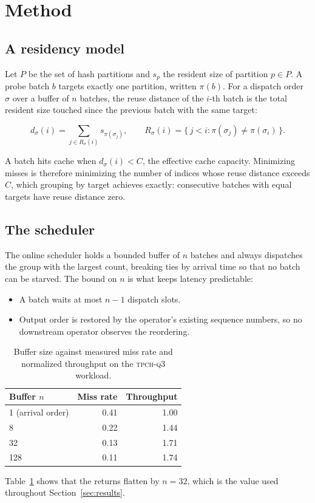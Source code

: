 \section{Method}
\label{sec:method}

\subsection{A residency model}

Let \(P\) be the set of hash partitions and \(s_p\) the resident size of
partition \(p \in P\). A probe batch \(b\) targets exactly one partition,
written \(\pi(b)\). For a dispatch order \(\sigma\) over a buffer of \(n\)
batches, the reuse distance of the \(i\)-th batch is the total resident
size touched since the previous batch with the same target:

\begin{equation}
\label{eq:reuse}
d_\sigma(i) = \sum_{j \in R_\sigma(i)} s_{\pi(\sigma_j)},
\qquad
R_\sigma(i) = \{\, j < i : \pi(\sigma_j) \neq \pi(\sigma_i) \,\}.
\end{equation}

A batch hits cache when \(d_\sigma(i) < C\), the effective cache capacity.
Minimizing misses is therefore minimizing the number of indices whose
reuse distance exceeds \(C\), which grouping by target achieves exactly:
consecutive batches with equal targets have reuse distance zero.

\subsection{The scheduler}

The online scheduler holds a bounded buffer of \(n\) batches and always
dispatches the group with the largest count, breaking ties by arrival
time so that no batch can be starved. The bound on \(n\) is what keeps
latency predictable:

\begin{itemize}
\item A batch waits at most \(n - 1\) dispatch slots.
\item Output order is restored by the operator's existing sequence
  numbers, so no downstream operator observes the reordering.
\end{itemize}

\begin{table}[htbp]
\centering
\begin{tabular}{lrr}
\toprule
Buffer \(n\) & Miss rate & Throughput \\
\midrule
1 (arrival order) & 0.41 & 1.00 \\
8 & 0.22 & 1.44 \\
32 & 0.13 & 1.71 \\
128 & 0.11 & 1.74 \\
\bottomrule
\end{tabular}
\caption{Buffer size against measured miss rate and normalized
throughput on the \textsc{tpch-q3} workload.}
\label{tab:buffer}
\end{table}

Table~\ref{tab:buffer} shows that the returns flatten by \(n = 32\),
which is the value used throughout Section~\ref{sec:results}.
